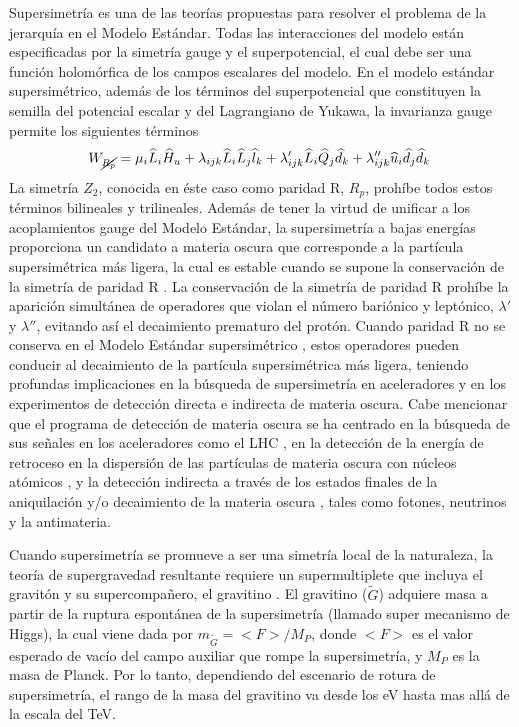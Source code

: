 Supersimetría \cite{Martin:1997ns,Haber:1984rc} es una de las teorías
propuestas para resolver el problema de la jerarquía en el Modelo
Estándar. Todas las interacciones del
modelo están especificadas por la simetría gauge y el superpotencial,
el cual debe ser una función holomórfica de los campos escalares del
modelo. En el modelo estándar supersimétrico, además de los términos
del superpotencial que constituyen la semilla del potencial escalar y
del Lagrangiano de Yukawa, la invarianza gauge permite los siguientes
términos
\begin{equation}
  \label{eq:5}
  W_{\cancel{R_p}} = \mu_i\widehat{L}_i\widehat{H}_u + 
  \lambda_{i j k}\widehat{L}_i\widehat{L}_j\widehat{l}_k +
  \lambda'_{i j k}\widehat{L}_i\widehat{Q}_j\widehat{d}_k + 
  \lambda''_{ijk}\widehat{u}_i\widehat{d}_j\widehat{d}_k\,
\end{equation}
La simetría $Z_2$, conocida en éste caso como paridad R, $R_p$,
prohíbe todos estos términos bilineales y trilineales. Además de tener
la virtud de unificar a los acoplamientos gauge del Modelo Estándar,
la supersimetría a bajas energías proporciona un candidato a materia
oscura que corresponde a la partícula supersimétrica más ligera, la
cual es estable cuando se supone la conservación de la simetría de
paridad R \cite{Ellis:1983ew}. La conservación de la simetría de
paridad R prohíbe la aparición simultánea de operadores que violan el
número bariónico y leptónico, $\lambda'$ y $\lambda''$, evitando así
el decaimiento prematuro del protón. Cuando paridad R no se conserva
en el Modelo Estándar supersimétrico \cite{Barbier:2004ez}, estos
operadores pueden conducir al decaimiento de la partícula
supersimétrica más ligera, teniendo profundas implicaciones en la
búsqueda de supersimetría en aceleradores y en los experimentos de
detección directa e indirecta de materia oscura. Cabe mencionar que el
programa de detección de materia oscura se ha centrado en la búsqueda
de sus señales en los aceleradores como el LHC
\cite{Baltz:2006fm,Cho:2008tj,Nath:2010zj}, en la detección de la
energía de retroceso en la dispersión de las partículas de materia
oscura con núcleos atómicos
\cite{Green:2007rb,Bertone:2007xj,Drees:2008bv,Green:2008rd}, y la
detección indirecta a través de los estados finales de la aniquilación
y/o decaimiento de la materia oscura
\cite{Bertone:2007aw,Eichler:1989br,Arvanitaki:2008hq,Ibarra:2008jk,Ibarra:2008qg,Buckley:2009kw,Ibarra:2009tn,Ruderman:2009ta},
tales como fotones, neutrinos y la antimateria.

Cuando supersimetría se promueve a ser una simetría local de la
naturaleza, la teoría de supergravedad resultante requiere un
supermultiplete que incluya el gravitón y su supercompañero, el
gravitino \cite{Martin:1997ns,Nilles:1983ge}. El gravitino ($\tilde
G$) adquiere masa a partir de la ruptura espontánea de la
supersimetría (llamado super mecanismo de Higgs), la cual viene dada
por $m_{\tilde G}=<F>/M_P$, donde $<F>$ es el valor esperado de vacío
del campo auxiliar que rompe la supersimetría, y $M_P$ es la masa de
Planck. Por lo tanto, dependiendo del escenario de rotura de
supersimetría, el rango de la masa del gravitino va desde los eV hasta
mas allá de la escala del TeV.

